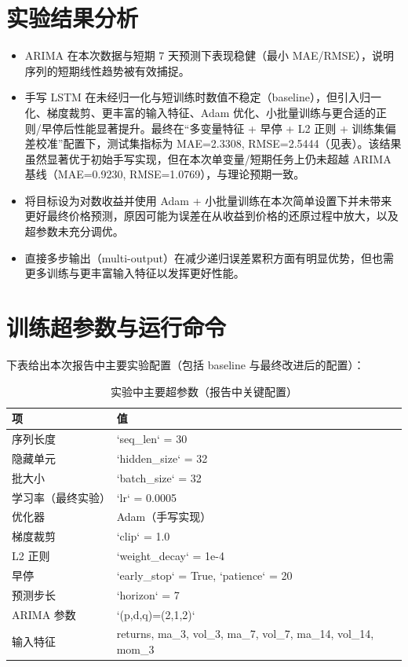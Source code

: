 \section{实验结果分析}
\begin{itemize}
    \item ARIMA 在本次数据与短期 7 天预测下表现稳健（最小 MAE/RMSE），说明序列的短期线性趋势被有效捕捉。
    \item 手写 LSTM 在未经归一化与短训练时数值不稳定（baseline），但引入归一化、梯度裁剪、更丰富的输入特征、Adam 优化、小批量训练与更合适的正则/早停后性能显著提升。最终在“多变量特征 + 早停 + L2 正则 + 训练集偏差校准”配置下，测试集指标为 MAE=2.3308, RMSE=2.5444（见表）。该结果虽然显著优于初始手写实现，但在本次单变量/短期任务上仍未超越 ARIMA 基线（MAE=0.9230, RMSE=1.0769），与理论预期一致。
    \item 将目标设为对数收益并使用 Adam + 小批量训练在本次简单设置下并未带来更好最终价格预测，原因可能为误差在从收益到价格的还原过程中放大，以及超参数未充分调优。
    \item 直接多步输出（multi-output）在减少递归误差累积方面有明显优势，但也需更多训练与更丰富输入特征以发挥更好性能。
\end{itemize}

\section{训练超参数与运行命令}
下表给出本次报告中主要实验配置（包括 baseline 与最终改进后的配置）：
\begin{table}[htbp]
\centering
\begin{tabular}{l l}
\hline
项 & 值 \\
\hline
序列长度 & `seq\_len` = 30 \\
隐藏单元 & `hidden\_size` = 32 \\
批大小 & `batch\_size` = 32 \\
学习率（最终实验） & `lr` = 0.0005 \\
优化器 & Adam（手写实现） \\
梯度裁剪 & `clip` = 1.0 \\
L2 正则 & `weight\_decay` = 1e-4 \\
早停 & `early\_stop` = True, `patience` = 20 \\
预测步长 & `horizon` = 7 \\
ARIMA 参数 & `(p,d,q)=(2,1,2)` \\
输入特征 & returns, ma\_3, vol\_3, ma\_7, vol\_7, ma\_14, vol\_14, mom\_3 \\
\hline
\end{tabular}
\caption{实验中主要超参数（报告中关键配置）}
\end{table}

